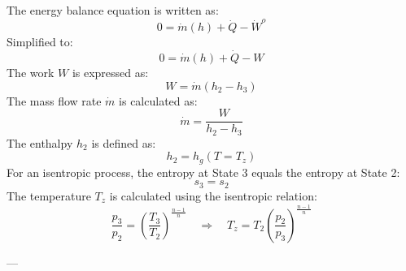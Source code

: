 The energy balance equation is written as:  
\[
0 = \dot{m}(h) + \dot{Q} - \dot{W}^o
\]  
Simplified to:  
\[
0 = \dot{m}(h) + \dot{Q} - W
\]  
The work \(W\) is expressed as:  
\[
W = \dot{m}(h_2 - h_3)
\]  
The mass flow rate \(\dot{m}\) is calculated as:  
\[
\dot{m} = \frac{W}{h_2 - h_3}
\]  
The enthalpy \(h_2\) is defined as:  
\[
h_2 = h_g(T = T_z)
\]  
For an isentropic process, the entropy at State 3 equals the entropy at State 2:  
\[
s_3 = s_2
\]  
The temperature \(T_z\) is calculated using the isentropic relation:  
\[
\frac{p_3}{p_2} = \left(\frac{T_3}{T_2}\right)^{\frac{n-1}{n}} \quad \Rightarrow \quad T_z = T_2 \left(\frac{p_2}{p_3}\right)^{\frac{n-1}{n}}
\]

---